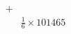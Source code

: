 \documentclass[preview]{standalone}
\begin{document}
\begin{align*}
+&\\&\frac{1}{6}\times101465
\end{align*}
\end{document}
